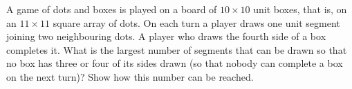 A game of dots and boxes is played on a board of $10\times10$ unit boxes, that is, on an $11\times11$ square array of dots. On each turn a player draws one unit segment joining two neighbouring dots. A player who draws the fourth side of a box completes it. What is the largest number of segments that can be drawn so that no box has three or four of its sides drawn (so that nobody can complete a box on the next turn)? Show how this number can be reached.
